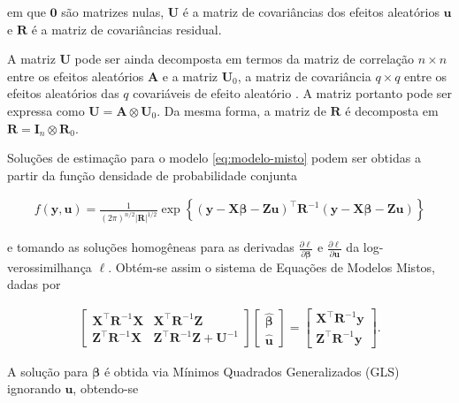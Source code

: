 \documentclass[12pt, a4paper, twoside]{report}
\numberwithin{equation}{subsection} %
\begin{document}
\noindent em que $\mathbf{0}$ são matrizes nulas, $\mathbf{U}$ é a matriz de covariâncias dos efeitos aleatórios $\mathbf{u}$ e $\mathbf{R}$ é a matriz de covariâncias residual.

A matriz $\mathbf{U}$ pode ser ainda decomposta em termos da matriz de correlação $n \times n$ entre os efeitos aleatórios $\mathbf{A}$ e a matriz $\mathbf{U}_0$, a matriz de covariância $q \times q$ entre os efeitos aleatórios das $q$ covariáveis de efeito aleatório \citep{comp_variancias_ufv}. A matriz portanto pode ser expressa como $\mathbf{U} = \mathbf{A} \otimes \mathbf{U}_0$. Da mesma forma, a matriz de $\mathbf{R}$ é decomposta em $\mathbf{R} = \mathbf{I}_n \otimes \mathbf{R}_0$.


Soluções de estimação para o modelo \ref{eq:modelo-misto} podem ser obtidas a partir da função densidade de probabilidade conjunta

\begin{align}
	f(\mathbf{y}, \mathbf{u}) = \frac{1}{(2\pi)^{n/2} |\mathbf{R}|^{1/2}} \exp \left\{ (\mathbf{y} - \mathbf{X}\boldsymbol{\beta} - \mathbf{Z}\mathbf{u})^\top \mathbf{R}^{-1} (\mathbf{y} - \mathbf{X}\boldsymbol{\beta} - \mathbf{Z}\mathbf{u}) \right\}
\end{align}

\noindent e tomando as soluções homogêneas para as derivadas $\frac{\partial \ell}{\partial \boldsymbol{\beta}}$ e $\frac{\partial \ell}{\partial \mathbf{u}}$ da log-verossimilhança $\ell$. Obtém-se assim o sistema de Equações de Modelos Mistos, dadas por

\begin{align}
	\begin{bmatrix}
		\mathbf{X}^\top \mathbf{R}^{-1}\mathbf{X} & \mathbf{X}^\top \mathbf{R}^{-1}\mathbf{Z} \\
		\mathbf{Z}^\top \mathbf{R}^{-1}\mathbf{X} & \mathbf{Z}^\top \mathbf{R}^{-1}\mathbf{Z} + \mathbf{U}^{-1}
	\end{bmatrix}
	\begin{bmatrix}
		\hat{\boldsymbol{\beta}} \\ \hat{\mathbf{u}}
	\end{bmatrix} = 
	\begin{bmatrix}
		\mathbf{X}^\top \mathbf{R}^{-1}\mathbf{y} \\ \mathbf{Z}^\top \mathbf{R}^{-1}\mathbf{y}
	\end{bmatrix}.
\end{align}

\noindent A solução para $\boldsymbol{\beta}$ é obtida via Mínimos Quadrados Generalizados (GLS) ignorando $\mathbf{u}$, obtendo-se
\end{document}
